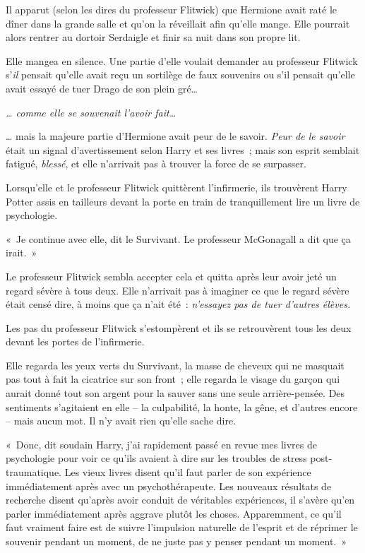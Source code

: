 Il apparut (selon les dires du professeur Flitwick) que Hermione avait raté le dîner dans la grande salle et qu'on la réveillait afin qu'elle mange. Elle pourrait alors rentrer au dortoir Serdaigle et finir sa nuit dans son propre lit.

Elle mangea en silence. Une partie d'elle voulait demander au professeur Flitwick s'\emph{il} pensait qu'elle avait reçu un sortilège de faux souvenirs ou s'il pensait qu'elle avait essayé de tuer Drago de son plein gré…

\emph{… comme elle se souvenait l'avoir fait…}

… mais la majeure partie d'Hermione avait peur de le savoir. \emph{Peur de le savoir} était un signal d'avertissement selon Harry et ses livres~; mais son esprit semblait fatigué, \emph{blessé}, et elle n'arrivait pas à trouver la force de se surpasser.

Lorsqu'elle et le professeur Flitwick quittèrent l'infirmerie, ils trouvèrent Harry Potter assis en tailleurs devant la porte en train de tranquillement lire un livre de psychologie.

«~Je continue avec elle, dit le Survivant. Le professeur McGonagall a dit que ça irait.~»

Le professeur Flitwick sembla accepter cela et quitta après leur avoir jeté un regard sévère à tous deux. Elle n'arrivait pas à imaginer ce que le regard sévère était censé dire, à moins que ça n'ait été~: \emph{n'essayez pas de tuer d'autres élèves.}

Les pas du professeur Flitwick s'estompèrent et ils se retrouvèrent tous les deux devant les portes de l'infirmerie.

Elle regarda les yeux verts du Survivant, la masse de cheveux qui ne masquait pas tout à fait la cicatrice sur son front~; elle regarda le visage du garçon qui aurait donné tout son argent pour la sauver sans une seule arrière-pensée. Des sentiments s'agitaient en elle -- la culpabilité, la honte, la gêne, et d'autres encore -- mais aucun mot. Il n'y avait rien qu'elle sache dire.

«~Donc, dit soudain Harry, j'ai rapidement passé en revue mes livres de psychologie pour voir ce qu'ils avaient à dire sur les troubles de stress post-traumatique. Les vieux livres disent qu'il faut parler de son expérience immédiatement après avec un psychothérapeute. Les nouveaux résultats de recherche disent qu'après avoir conduit de véritables expériences, il s'avère qu'en parler immédiatement après aggrave plutôt les choses. Apparemment, ce qu'il faut vraiment faire est de suivre l'impulsion naturelle de l'esprit et de réprimer le souvenir pendant un moment, de ne juste pas y penser pendant un moment.~»

